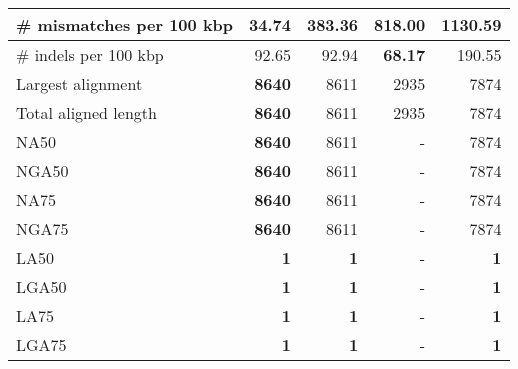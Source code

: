 \documentclass[12pt,a4paper]{article}
\begin{document}
\begin{table}[ht]
\begin{center}
\begin{tabular}{|l*{4}{|r}|}
\# mismatches per 100 kbp & {\bf 34.74} & 383.36 & 818.00 & 1130.59 \\ \hline
\# indels per 100 kbp & 92.65 & 92.94 & {\bf 68.17} & 190.55 \\ \hline
Largest alignment & {\bf 8640} & 8611 & 2935 & 7874 \\ \hline
Total aligned length & {\bf 8640} & 8611 & 2935 & 7874 \\ \hline
NA50 & {\bf 8640} & 8611 & - & 7874 \\ \hline
NGA50 & {\bf 8640} & 8611 & - & 7874 \\ \hline
NA75 & {\bf 8640} & 8611 & - & 7874 \\ \hline
NGA75 & {\bf 8640} & 8611 & - & 7874 \\ \hline
LA50 & {\bf 1} & {\bf 1} & - & {\bf 1} \\ \hline
LGA50 & {\bf 1} & {\bf 1} & - & {\bf 1} \\ \hline
LA75 & {\bf 1} & {\bf 1} & - & {\bf 1} \\ \hline
LGA75 & {\bf 1} & {\bf 1} & - & {\bf 1} \\ \hline
\end{tabular}
\end{center}
\end{table}
\end{document}
